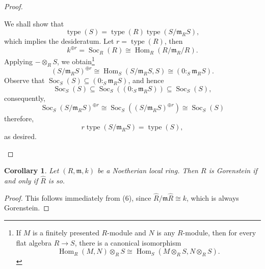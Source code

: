 \documentclass[10pt]{article}
\theoremstyle{thmstyle}
\theoremstyle{defstyle}
\newtheorem{corollary}[theorem]{Corollary}
\newcommand{\Hom}{\operatorname{Hom}}
\newcommand{\frakm}{\mathfrak{m}} %
\newcommand{\wh}[1]{\widehat{#1}}
\newcommand{\Soc}{\operatorname{Soc}}
\newcommand{\type}{\operatorname{type}}
\begin{document}
\begin{proof}
\begin{enumerate}[label=(\arabic*)]
    We shall show that 
    \begin{equation*}
        \type(S) = \type(R)\type\left(S/\frakm_R S\right),
    \end{equation*}
    which implies the desideratum. Let $r = \type(R)$, then 
    \begin{equation*}
        k^{\oplus r} = \Soc_R(R)\cong\Hom_R\left(R/\frakm_R/ R\right).
    \end{equation*}
    Applying $-\otimes_R S$, we obtain\footnote{If $M$ is a finitely presented $R$-module and $N$ is any $R$-module, then for every flat algebra $R\to S$, there is a canonical isomorphism $$\Hom_R(M, N)\otimes_R S\cong \Hom_S(M\otimes_R S, N\otimes_R S).$$}
    \begin{equation*}
        \left(S/\frakm_RS\right)^{\oplus r}\cong\Hom_S\left(S/\frakm_R S, S\right)\cong\left(0 :_S\frakm_R S\right).
    \end{equation*}
    Observe that $\Soc_S(S)\subseteq\left(0 :_S \frakm_R S\right)$, and hence 
    \begin{equation*}
        \Soc_S(S)\subseteq\Soc_S\left((0:_S\frakm_R S)\right)\subseteq\Soc_S(S),
    \end{equation*}
    consequently, 
    \begin{equation*}
        \Soc_S\left(S/\frakm_R S\right)^{\oplus r}\cong\Soc_S\left(\left(S/\frakm_R S\right)^{\oplus r}\right)\cong\Soc_S(S) 
    \end{equation*}
    therefore, 
    \begin{equation*}
        r\type\left(S/\frakm_R S\right) = \type(S),
    \end{equation*}
    as desired. \qedhere
\end{enumerate}
\end{proof}

\begin{corollary}
    Let $(R,\frakm, k)$ be a Noetherian local ring. Then $R$ is Gorenstein if and only if $\wh R$ is so.
\end{corollary}
\begin{proof}
    This follows immediately from  (6), since $\wh R/\frakm\wh R\cong k$, which is always Gorenstein.
\end{proof}
\end{document}
